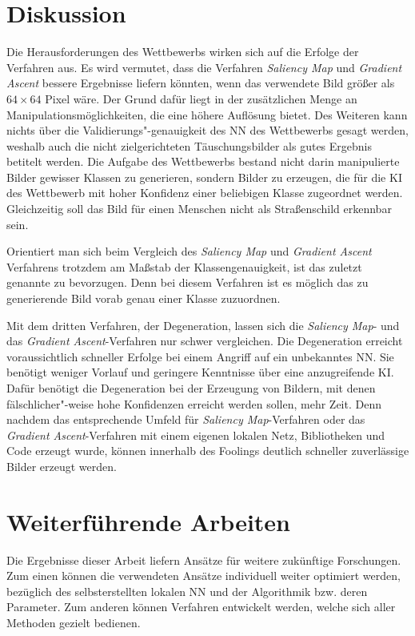 \section{Diskussion}
Die Herausforderungen des Wettbewerbs wirken sich auf die Erfolge der Verfahren aus.
Es wird vermutet, dass die Verfahren \textit{Saliency Map} und \textit{Gradient Ascent} bessere Ergebnisse liefern könnten, wenn das verwendete Bild größer als $64\times64$ Pixel wäre. 
Der Grund dafür liegt in der zusätzlichen Menge an Manipulationsmöglichkeiten, die eine höhere Auflösung bietet. 
Des Weiteren kann nichts über die Validierungs"-genauigkeit des \ac{NN} des Wettbewerbs gesagt werden, weshalb auch die nicht zielgerichteten Täuschungsbilder als gutes Ergebnis betitelt werden. 
Die Aufgabe des Wettbewerbs bestand nicht darin manipulierte Bilder gewisser Klassen zu generieren, sondern Bilder zu erzeugen, die für die \ac{KI} des Wettbewerb mit hoher Konfidenz einer beliebigen Klasse zugeordnet werden. 
Gleichzeitig soll das Bild für einen Menschen nicht als Straßenschild erkennbar sein.

Orientiert man sich beim Vergleich des \textit{Saliency Map} und \textit{Gradient Ascent} Verfahrens trotzdem am Maßstab der Klassengenauigkeit, ist das zuletzt genannte zu bevorzugen. 
Denn bei diesem Verfahren ist es möglich das zu generierende Bild vorab genau einer Klasse zuzuordnen. 

Mit dem dritten Verfahren, der Degeneration, lassen sich die \textit{Saliency Map}- und das \textit{Gradient Ascent}-Verfahren nur schwer vergleichen.
Die Degeneration erreicht voraussichtlich schneller Erfolge bei einem Angriff auf ein unbekanntes \ac{NN}. 
Sie benötigt weniger Vorlauf und geringere Kenntnisse über eine anzugreifende \ac{KI}. 
Dafür benötigt die Degeneration bei der Erzeugung von Bildern, mit denen fälschlicher"-weise hohe Konfidenzen erreicht werden sollen, mehr Zeit.
Denn nachdem das entsprechende Umfeld für \textit{Saliency Map}-Verfahren oder das \textit{Gradient Ascent}-Verfahren mit einem eigenen lokalen Netz, Bibliotheken und Code erzeugt wurde, können innerhalb des Foolings deutlich schneller zuverlässige Bilder erzeugt werden.  

\section{Weiterführende Arbeiten}
Die Ergebnisse dieser Arbeit liefern Ansätze für weitere zukünftige Forschungen. 
Zum einen können die verwendeten Ansätze individuell weiter optimiert werden, bezüglich des selbsterstellten lokalen \acl{NN} und der Algorithmik bzw. deren Parameter. 
Zum anderen können Verfahren entwickelt werden, welche sich aller Methoden gezielt bedienen. 


